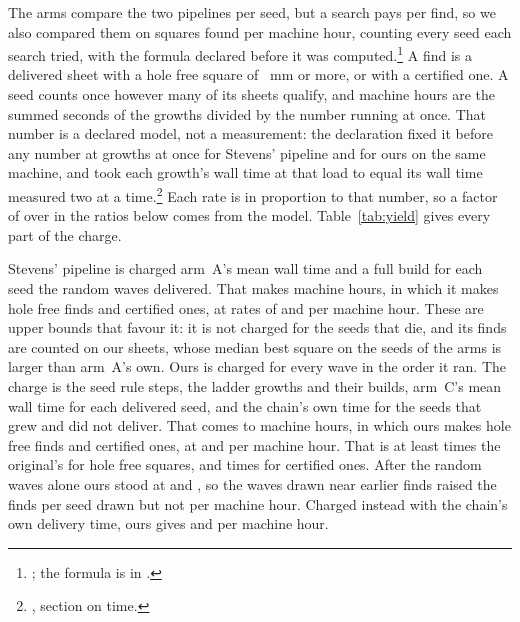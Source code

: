 The arms compare the two pipelines per seed, but a search pays per find, so we also compared them on squares found per
machine hour, counting every seed each search tried, with the formula declared before it was
computed.\footnote{; the formula is in .} A find is a
delivered sheet with a hole free square of \SourceThreshold{}~mm or more, or with a certified one. A seed counts once
however many of its sheets qualify, and machine hours are the summed seconds of the growths divided by the number
running at once. That number is a declared model, not a measurement: the declaration fixed it before any number at
\YieldOrigK{} growths at once for Stevens' pipeline and \YieldOursK{} for ours on the same machine,
and took each growth's wall time at that load to equal its wall time measured two at a time.\footnote{,
section on time.} Each rate is in proportion to that number, so a factor of \YieldOursK{} over \YieldOrigK{} in the
ratios below comes from the model. Table~\ref{tab:yield} gives every part of the charge.

Stevens' pipeline is charged arm~A's mean wall time and a full build for each seed the random waves delivered. That
makes \YieldOrigHours{} machine hours, in which it makes \YieldOrigFindsHf{} hole free finds and \YieldOrigFindsCert{}
certified ones, at rates of \YieldOrigRateHf{} and \YieldOrigRateCert{} per machine hour. These are upper bounds that
favour it: it is not charged for the seeds that die, and its finds are counted on our sheets, whose median best square
on the seeds of the arms is larger than arm~A's own. Ours is charged for every wave in the order it ran. The charge is
the seed rule steps, the ladder growths and their builds, arm~C's mean wall time for each delivered seed, and the chain's
own time for the seeds that grew and did not deliver. That comes to \YieldOursHours{} machine hours, in which ours makes
\YieldOursFindsHf{} hole free finds and \YieldOursFindsCert{} certified ones, at \YieldOursRateHf{} and
\YieldOursRateCert{} per machine hour. That is at least \YieldRatioHf{} times the original's for hole free squares, and
\YieldRatioCert{} times for certified ones. After the random waves alone ours stood at \YieldOursRandomRateHf{} and
\YieldOursRandomRateCert{}, so the waves drawn near earlier finds raised the finds per seed drawn but not per machine
hour. Charged instead with the chain's own delivery time, ours gives \YieldDeliveredRateHf{} and
\YieldDeliveredRateCert{} per machine hour.

